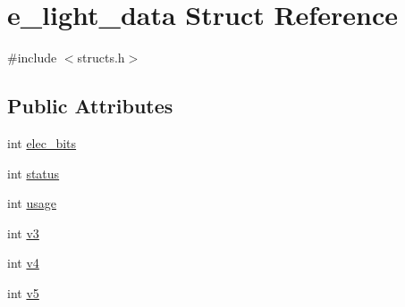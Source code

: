 \hypertarget{structe__light__data}{\section{e\-\_\-light\-\_\-data Struct Reference}
\label{structe__light__data}
}


{\ttfamily \#include $<$structs.\-h$>$}

\subsection*{Public Attributes}
\begin{DoxyCompactItemize}
\item 
int \hyperlink{structe__light__data_a4a2f59f9d1fd02fdc1a5b1bcfd15935c}{elec\-\_\-bits}
\item 
int \hyperlink{structe__light__data_ab853ee68a144f323a30746d3c6390355}{status}
\item 
int \hyperlink{structe__light__data_a1f4fbe78d6dfe140d0c0cad87c426583}{usage}
\item 
int \hyperlink{structe__light__data_aa9fbb5ee228b191ebf6a53a7aab5dc70}{v3}
\item 
int \hyperlink{structe__light__data_a51054be16dbcafab9ff59294c1feeb4b}{v4}
\item 
int \hyperlink{structe__light__data_adadbf877a642b5a33fbcfe764043cfc5}{v5}
\end{DoxyCompactItemize}


